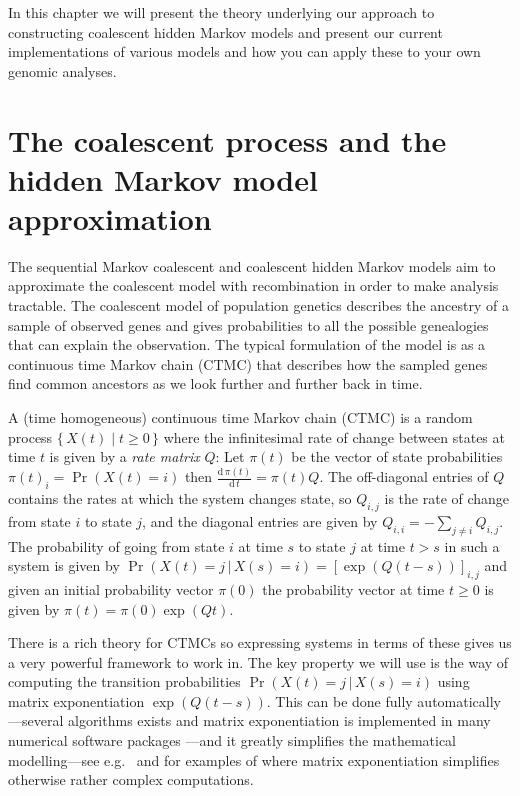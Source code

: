 \documentclass[graybox]{svmult}
\begin{document}
In this chapter we will present the theory underlying our approach to constructing coalescent hidden Markov models and present our current implementations of various models and how you can apply these to your own genomic analyses.


\section{The coalescent process and the hidden Markov model approximation}

The sequential Markov coalescent and coalescent hidden Markov models aim to approximate the coalescent model with recombination in order to make analysis tractable. The coalescent model of population genetics describes the ancestry of a sample of observed genes and gives probabilities to all the possible genealogies that can explain the observation. The typical formulation of the model is as a continuous time Markov chain (CTMC) that describes how the sampled genes find common ancestors as we look further and further back in time. 

A (time homogeneous) continuous time Markov chain (CTMC) is a random process $\{\,X(t) \;|\; t \geq 0 \,\}$ where the infinitesimal rate of change between states at time $t$ is given by a \emph{rate matrix} $Q$: Let $\pi(t)$ be the vector of state probabilities $\pi(t)_i = \Pr(X(t)=i)$ then $\frac{\mathrm{d}\,\pi(t)}{\mathrm{d}\,t} = \pi(t)Q$. The off-diagonal entries of $Q$ contains the rates at which the system changes state, so $Q_{i,j}$ is the rate of change from state $i$ to state $j$, and the diagonal entries are given by $Q_{i,i} = - \sum_{j\neq i} Q_{i,j}$. The probability of going from state $i$ at time $s$ to state $j$ at time $t>s$ in such a system is given by $\Pr(X(t)=j\,|\,X(s)=i) = \left[\exp\left(Q\left(t-s\right)\right)\right]_{i,j}$ and given an initial probability vector $\pi(0)$ the probability vector at time $t\geq 0$ is given by $\pi(t)=\pi(0)\exp(Qt)$.

There is a rich theory for CTMCs so expressing systems in terms of these gives us a very powerful framework to work in. The key property we will use is the way of computing the transition probabilities $\Pr(X(t)=j\,|\,X(s)=i)$ using matrix exponentiation $\exp\left(Q\left(t-s\right)\right)$. This can be done fully automatically---several algorithms exists and matrix exponentiation is implemented in many numerical software packages \cite{Moler2003}---and it greatly simplifies the mathematical modelling---see e.g.\ \citet{Hobolth:2011hl} and \citet{Andersen:2013iz} for examples of where matrix exponentiation simplifies otherwise rather complex computations.
\end{document}
